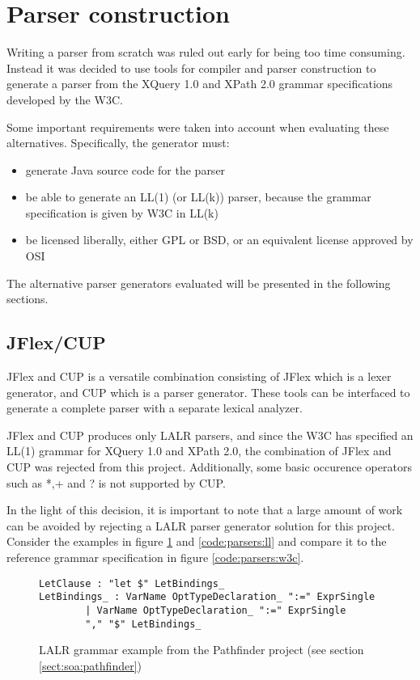 \section{Parser construction}
\label{sect:method:alternatives}
Writing a parser from scratch was ruled out early for being too time consuming.
Instead it was decided to use tools for compiler and parser construction to
generate a parser from the XQuery 1.0 and XPath 2.0 grammar  
specifications\cite{w3c01} developed by the W3C.

Some important requirements were taken into account when evaluating these
alternatives. Specifically, the generator must:
\begin{itemize}
  \item generate Java source code for the parser
  \item be able to generate an LL(1) (or LL(k)) parser, because the grammar  
  specification is given by W3C in LL(k)
  \item be licensed liberally, either GPL or BSD, or an equivalent license
  approved by OSI
\end{itemize}

The alternative parser generators evaluated will be presented in the following sections.

\subsection{JFlex/CUP}
JFlex and CUP is a versatile combination consisting of JFlex which is a lexer
generator, and CUP which is a parser generator. These tools can be interfaced to
generate a complete parser with a separate lexical analyzer.

JFlex and CUP produces only LALR parsers, and since the W3C has specified an
LL(1) grammar for XQuery 1.0 and XPath 2.0, the combination of JFlex and CUP was
rejected from this project. Additionally, some basic occurence operators such as
*,+ and ? is not supported by CUP.

In the light of this decision, it is important to note that a large amount of
work can be avoided by rejecting a LALR parser generator solution for this
project. Consider the examples in figure \ref{code:parsers:lalr} and
\ref{code:parsers:ll} and compare it to the reference grammar specification in
figure \ref{code:parsers:w3c}.

\begin{figure}[h!]
\begin{verbatim}
LetClause : "let $" LetBindings_
LetBindings_ : VarName OptTypeDeclaration_ ":=" ExprSingle
        | VarName OptTypeDeclaration_ ":=" ExprSingle
        "," "$" LetBindings_
\end{verbatim}
\caption[LALR grammar example]{LALR grammar example from the Pathfinder project
(see section \ref{sect:soa:pathfinder})}
\label{code:parsers:lalr}
\end{figure}

